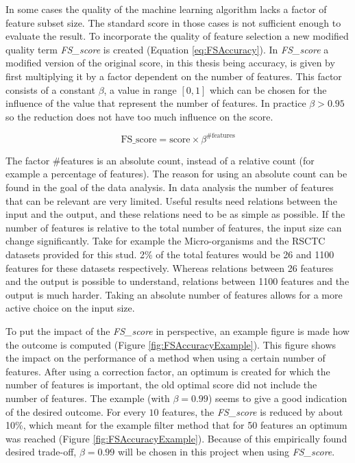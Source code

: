 \documentclass[10pt,a4paper]{report}
\begin{document}
	In some cases the quality of the machine learning algorithm lacks a factor of feature subset size. The standard score in those cases is not sufficient enough to evaluate the result. To incorporate the quality of feature selection a new modified quality term \textit{FS\_score} is created (Equation \ref{eq:FSAccuracy}). In \textit{FS\_score} a modified version of the original score, in this thesis being accuracy, is given by first multiplying it by a factor dependent on the number of features. This factor consists of a constant $\beta$, a value in range $[0, 1]$ which can be chosen for the influence of the  value that represent the number of features. In practice $\beta > 0.95$ so the reduction does not have too much influence on the score.
	
	\begin{equation*}
	\label{eq:FSAccuracy}
	\text{FS\_score} = \text{score} \times \beta^{\text{\#features}}
	\end{equation*}
	
	The factor \mbox{\#features} is an absolute count, instead of a relative count (for example a percentage of features). The reason for using an absolute count can be found in the goal of the data analysis. In data analysis the number of features that can be relevant are very limited. Useful results need relations between the input and the output, and these relations need to be as simple as possible. If the number of features is relative to the total number of features, the input size can change significantly. Take for example the Micro-organisms and the RSCTC datasets provided for this stud. 2\% of the total features would be 26 and 1100 features for these datasets respectively. Whereas relations between 26 features and the output is possible to understand, relations between 1100 features and the output is much harder. Taking an absolute number of features allows for a more active choice on the input size.
	
	To put the impact of the \textit{FS\_score} in perspective, an example figure is made how the outcome is computed (Figure \ref{fig:FSAccuracyExample}). This figure shows the impact on the performance of a method when using a certain number of features. After using a correction factor, an optimum is created for which the number of features is important, the old optimal score did not include the number of features. The example (with $\beta = 0.99$) seems to give a good indication of the desired outcome. For every $10$ features, the \textit{FS\_score} is reduced by about 10\%, which meant for the example filter method that for 50 features an optimum was reached (Figure \ref{fig:FSAccuracyExample}). Because of this empirically found desired trade-off, $\beta = 0.99$ will be chosen in this project when using \textit{FS\_score}. 
	
\end{document}
